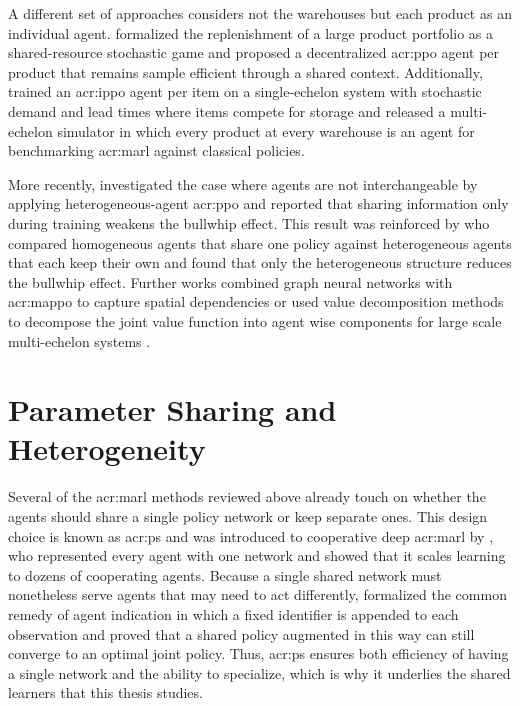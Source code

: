 A different set of approaches considers not the warehouses but each product as an individual agent. \citet{ding2022sharedresources} formalized the replenishment of a large product portfolio as a shared-resource stochastic game and proposed a decentralized \gls{acr:ppo} agent per product that remains sample efficient through a shared context. Additionally, \citet{leluc2023marlim} trained an \gls{acr:ippo} agent per item on a single-echelon system with stochastic demand and lead times where items compete for storage and \citet{yang2023mabim} released a multi-echelon simulator in which every product at every warehouse is an agent for benchmarking \gls{acr:marl} against classical policies.

More recently, \citet{liu2024multiechelonmarl} investigated the case where agents are not interchangeable by applying heterogeneous-agent \gls{acr:ppo} and reported that sharing information only during training weakens the bullwhip effect. This result was reinforced by \citet{wang2025symbiotic} who compared homogeneous agents that share one policy against heterogeneous agents that each keep their own and found that only the heterogeneous structure reduces the bullwhip effect. Further works combined graph neural networks with \gls{acr:mappo} to capture spatial dependencies \citep{kotecha2025gnn} or used value decomposition methods to decompose the joint value function into agent wise components for large scale multi-echelon systems \citep{zhou2024spareparts}.\\



\section{Parameter Sharing and Heterogeneity}
\label{sec:ps-heterogeneity}

Several of the \gls{acr:marl} methods reviewed above already touch on whether the agents should share a single policy network or keep separate ones. This design choice is known as \gls{acr:ps} and was introduced to cooperative deep \gls{acr:marl} by \citet{gupta2017cooperative}, who represented every agent with one network and showed that it scales learning to dozens of cooperating agents. Because a single shared network must nonetheless serve agents that may need to act differently, \citet{terry2020revisiting} formalized the common remedy of agent indication in which a fixed identifier is appended to each observation and proved that a shared policy augmented in this way can still converge to an optimal joint policy. Thus, \gls{acr:ps} ensures both efficiency of having a single network and the ability to specialize, which is why it underlies the shared learners that this thesis studies.

